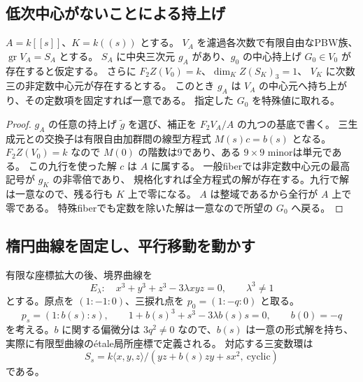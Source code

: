\subsection{低次中心がないことによる持上げ}
\begin{lemma}[中央三次の正則持上げ]\label{lem:central-lift}
$A=k[[s]]$、$K=k((s))$ とする。
$V_A$ を濾過各次数で有限自由なPBW族、$\operatorname{gr}V_A=S_A$ とする。
$S_A$ に中央三次元 $g_A$ があり、$g_0$ の中心持上げ $G_0\in V_0$ が存在すると仮定する。
さらに $F_2Z(V_0)=k$、$\dim_K Z(S_K)_3=1$、
$V_K$ に次数三の非定数中心元が存在するとする。
このとき $g_A$ は $V_A$ の中心元へ持ち上がり、その定数項を固定すれば一意である。
指定した $G_0$ を特殊値に取れる。
\end{lemma}
\begin{proof}
$g_A$ の任意の持上げ $\widetilde g$ を選び、補正を
$F_2V_A/A$ の九つの基底で書く。
三生成元との交換子は有限自由加群間の線型方程式 $M(s)c=b(s)$ となる。
$F_2Z(V_0)=k$ なので $M(0)$ の階数は9であり、ある $9\times9$ minorは単元である。
この九行を使った解 $c$ は $A$ に属する。
一般fiberでは非定数中心元の最高記号が $g_K$ の非零倍であり、
規格化すれば全方程式の解が存在する。九行で解は一意なので、残る行も $K$ 上で零になる。
$A$ は整域であるから全行が $A$ 上で零である。
特殊fiberでも定数を除いた解は一意なので所望の $G_0$ へ戻る。
\end{proof}

\subsection{楕円曲線を固定し、平行移動を動かす}
有限な座標拡大の後、境界曲線を
\[
E_\lambda:\quad x^3+y^3+z^3-3\lambda xyz=0,\qquad \lambda^3\ne1
\]
とする。原点を $(1:-1:0)$、三捩れ点を $p_0=(1:-q:0)$ と取る。
\[
p_s=(1:b(s):s),\qquad 1+b(s)^3+s^3-3\lambda b(s)s=0,\qquad b(0)=-q
\]
を考える。$b$ に関する偏微分は $3q^2\ne0$ なので、$b(s)$ は一意の形式解を持ち、
実際に有限型曲線の\'{e}tale局所座標で定義される。
対応する三変数環は
\[
S_s=k\langle x,y,z\rangle/(yz+b(s)zy+sx^2,\ \mathrm{cyclic})
\]
である。


